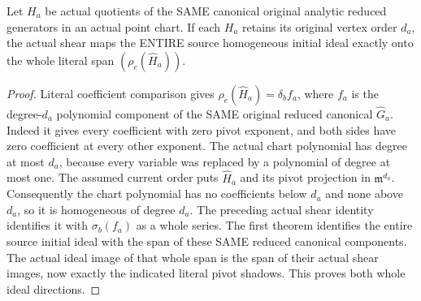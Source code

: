 \begin{theorem}
\label{hir:actual-point-order-retention-whole-source-shear-dictionary}
\leanok
Let $H_a$ be actual quotients of the SAME canonical original analytic
reduced generators in an actual point chart. If each $H_a$ retains its
original vertex order $d_a$, the actual shear maps the ENTIRE source
homogeneous initial ideal exactly onto the whole literal span
$(\rho_e(\widehat H_a))$.
\end{theorem}
\begin{proof}
Literal coefficient comparison gives
$\rho_e(\widehat H_a)=\delta_bf_a$, where $f_a$ is the degree-$d_a$
polynomial component of the SAME original reduced canonical
$\widehat G_a$. Indeed it gives every coefficient with zero pivot
exponent, and both sides have zero coefficient at every other exponent.
The actual chart polynomial has degree at most $d_a$, because every
variable was replaced by a polynomial of degree at most one. The
assumed current order puts $\widehat H_a$ and its pivot projection in
$\mathfrak m^{d_a}$. Consequently the chart polynomial has no
coefficients below $d_a$ and none above $d_a$, so it is homogeneous
of degree $d_a$. The preceding actual shear identity identifies it
with $\sigma_b(f_a)$ as a whole series. The first theorem identifies
the entire source initial ideal with the span of these SAME reduced
canonical components. The actual ideal image of that whole span is
the span of their actual shear images, now exactly the indicated
literal pivot shadows. This proves both whole ideal directions.
\end{proof}

